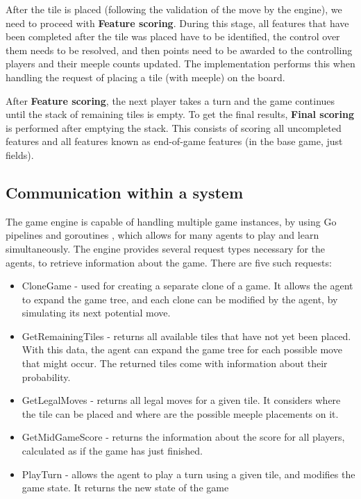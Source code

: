 After the tile is placed (following the validation of the move by the engine),
we need to proceed with \textbf{Feature scoring}. During this stage, all features that have been
completed after the tile was placed have to be identified, the control over them needs to be resolved,
and then points need to be awarded to the controlling players and their meeple counts updated.
The implementation performs this when handling the request of placing a tile (with meeple) on the board.

After \textbf{Feature scoring}, the next player takes a turn and the game continues
until the stack of remaining tiles is empty. To get the final results,
\textbf{Final scoring} is performed after emptying the stack. This consists of scoring
all uncompleted features and all features known as end-of-game features
(in the base game, just fields).

\subsection{Communication within a system}

The game engine is capable of handling multiple game instances, by using Go pipelines and goroutines \cite{GolangPipeline}, which allows for many agents to play and learn simultaneously. The engine provides several request types necessary for the agents, to retrieve information about the game. There are five such requests:
\begin{itemize}
    \item CloneGame - used for creating a separate clone of a game. It allows the agent to expand the game tree, and each clone can be modified by the agent, by simulating its next potential move.
    \item GetRemainingTiles - returns all available tiles that have not yet been placed. With this data, the agent can expand the game tree for each possible move that might occur. The returned tiles come with information about their probability.
    \item GetLegalMoves - returns all legal moves for a given tile. It considers where the tile can be placed and where are the possible meeple placements on it.
    \item GetMidGameScore - returns the information about the score for all players, calculated as if the game has just finished.
    \item PlayTurn - allows the agent to play a turn using a given tile, and modifies the game state. It returns the new state of the game 
\end{itemize}


